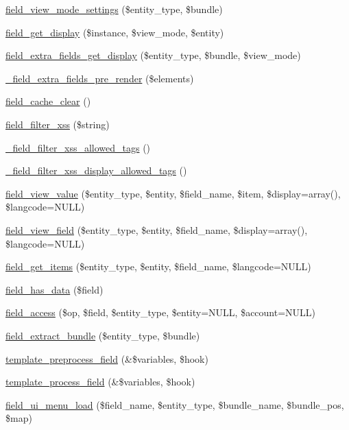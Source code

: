 \begin{DoxyCompactItemize}
\item 
\hyperlink{group__field_ga43d37035f8764e021f18821d46a92341}{field\_\-view\_\-mode\_\-settings} (\$entity\_\-type, \$bundle)
\item 
\hyperlink{group__field_ga2dca22263fe45c35bceca2186c7ccc77}{field\_\-get\_\-display} (\$instance, \$view\_\-mode, \$entity)
\item 
\hyperlink{group__field_ga3ec2b23abfecffb6a85e203b6233b84b}{field\_\-extra\_\-fields\_\-get\_\-display} (\$entity\_\-type, \$bundle, \$view\_\-mode)
\item 
\hyperlink{group__field_gaf9008661a037c20fca58ad9738495325}{\_\-field\_\-extra\_\-fields\_\-pre\_\-render} (\$elements)
\item 
\hyperlink{group__field_ga48d2c3c37e58251cd5abb49d38f8f039}{field\_\-cache\_\-clear} ()
\item 
\hyperlink{group__field_ga181095248684b8b5a45c08ab8d22a813}{field\_\-filter\_\-xss} (\$string)
\item 
\hyperlink{group__field_ga7ae8de4fae20a2142bb4c8d1e007cda5}{\_\-field\_\-filter\_\-xss\_\-allowed\_\-tags} ()
\item 
\hyperlink{group__field_ga047cdec864ecb94587790aa3ed5fbd18}{\_\-field\_\-filter\_\-xss\_\-display\_\-allowed\_\-tags} ()
\item 
\hyperlink{group__field_gab716b21eb481e4f9d9f5f2af71093d81}{field\_\-view\_\-value} (\$entity\_\-type, \$entity, \$field\_\-name, \$item, \$display=array(), \$langcode=NULL)
\item 
\hyperlink{group__field_gacb7c7349bbe181c174421e23210ae1ba}{field\_\-view\_\-field} (\$entity\_\-type, \$entity, \$field\_\-name, \$display=array(), \$langcode=NULL)
\item 
\hyperlink{group__field_ga32f621685ff4bccfb3fa51e43f27ea57}{field\_\-get\_\-items} (\$entity\_\-type, \$entity, \$field\_\-name, \$langcode=NULL)
\item 
\hyperlink{group__field_ga7545752dd04141d053f69416742a1ea4}{field\_\-has\_\-data} (\$field)
\item 
\hyperlink{group__field_gad363d4b50f9326e85cbf1180cd848b3b}{field\_\-access} (\$op, \$field, \$entity\_\-type, \$entity=NULL, \$account=NULL)
\item 
\hyperlink{group__field_gade5f766418eabc45894d745b3b4541c4}{field\_\-extract\_\-bundle} (\$entity\_\-type, \$bundle)
\item 
\hyperlink{group__field_ga6dc60d3c482230f380dd3b112487d717}{template\_\-preprocess\_\-field} (\&\$variables, \$hook)
\item 
\hyperlink{group__field_ga4fd3ce05ef61810b1f66283302ab7cad}{template\_\-process\_\-field} (\&\$variables, \$hook)
\item 
\hyperlink{group__field_gac2e5ac493328c146f17164168de40492}{field\_\-ui\_\-menu\_\-load} (\$field\_\-name, \$entity\_\-type, \$bundle\_\-name, \$bundle\_\-pos, \$map)
\end{DoxyCompactItemize}


